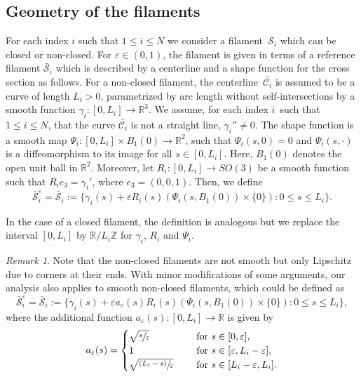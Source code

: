 \documentclass[10pt]{amsart}
\newcommand{\psfrac}[2]{\sfrac{(#1)}{#2}}
\newcommand{\R}{\mathbb{R}}
\newcommand{\Z}{\mathbb{Z}}
\let\eps\varepsilon
\theoremstyle{definition}
\theoremstyle{remark}
\newtheorem{remark}[thm]{Remark}
\begin{document}
\subsection{Geometry of the filaments}
For each index $i$ such that $ 1\leq i \leq N$
we consider a filament~$\mathcal S_i$ which can be closed or non-closed.
For $\eps \in (0,1)$, the filament is given in terms of a reference filament $\bar{\mathcal S}_i$ which is described by a centerline and a shape function for the cross section as follows.
For a non-closed filament, the centerline~$\bar {\mathcal C_i}$ is assumed to be a curve of length $L_i >0$, parametrized by arc length without self-intersections by a smooth function $\gamma_i \colon [0,L_i] \to \R^3$.
We assume, for each index $i$~such that $1\leq i \leq N$, that the curve $\bar {\mathcal C_i}$
is not a straight line, \ie $\gamma_i'' \neq 0$.
The shape function is a smooth map $\Psi_i \colon [0,L_i] \times B_1(0) \to \R^2$, such that $\Psi_i(s,0) = 0$ and
$\Psi_i(s,\cdot)$ is a diffeomorphism to its image for all $s \in [0,L_i]$. Here, $B_1(0)$ denotes the open unit ball in $\R^2$. Moreover, let $R_i \colon [0,L_i] \to SO(3)$ be a smooth function such that $R_i e_3 = \gamma_i'$, where $e_3=(0,0,1)$.
Then, we define
\begin{equation} \label{def:S^eps}
{\bar{ \mathcal S}_i^\eps}= \bar{ \mathcal S}_i := \{ \gamma_i(s) + \eps R_i(s)(\Psi_i(s,B_1(0)) \times \{0\}) : 0 \leq s \leq L_i \}.
\end{equation}

In the case of a closed filament, the definition is analogous but we replace the interval $[0,L_i]$ by $\R/L_i \Z$ for $\gamma_i$, $R_i$ and $ \Psi_i$.

\begin{remark} \label{rem:nonclosed.smooth}
Note that the non-closed filaments are not smooth but only Lipschitz due to corners at their ends. With minor modifications of some arguments, our analysis also applies to smooth non-closed filaments, which could be defined as
\begin{equation}
{\bar{ \mathcal S}_i^\eps} = \bar{ \mathcal S}_i := \{ \gamma_i(s) + \eps a_\eps(s) R_i(s)(\Psi_i(s,B_1(0)) \times \{0\}) : 0 \leq s \leq L_i \},
\end{equation}
where the additional function $a_\eps(s) : [0,L_i] \to \R$ is given by
\begin{equation}
a_\eps(s) = \begin{cases}
\sqrt{\sfrac s \eps} &\quad \text { for } s \in [0,\eps], \\
1 &\quad \text { for } s \in [\eps, L_i - \eps], \\
\sqrt{\psfrac{L_i - s}{\eps}} & \quad \text{ for } s \in [L_i-\eps,L_i].
\end{cases}
\end{equation}
\end{remark}
\end{document}
